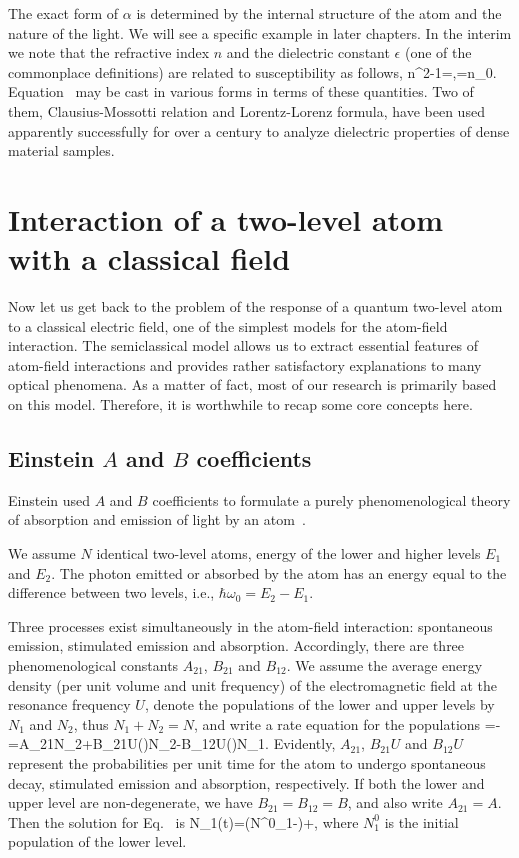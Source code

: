 The exact form of $\alpha$ is determined by the internal structure of the atom and the nature of the light. We will see a specific example in later chapters. In the interim we note that the refractive index $n$ and the dielectric constant $\epsilon$ (one of the commonplace definitions) are related to susceptibility as follows,
\beq
n^2-1=\chi,\quad \epsilon=n\epsilon_0.
\eeq
Equation~ may be cast in various forms in terms of these quantities. Two of them, Clausius-Mossotti relation and Lorentz-Lorenz formula, have been used apparently successfully for over a century to analyze dielectric properties of dense material samples.

\section{Interaction of a two-level atom with a classical field}

Now let us get back to the problem of the response of a quantum two-level atom to a classical electric field, one of the simplest models for the atom-field interaction\cite{quantum_optics}. The semiclassical model allows us to extract essential features of atom-field interactions and provides rather satisfactory explanations to many optical phenomena. As a matter of fact, most of our research is primarily based on this model. Therefore, it is worthwhile to recap some core concepts here.

\subsection{Einstein $A$ and $B$ coefficients}
Einstein used $A$ and $B$ coefficients to formulate a purely phenomenological theory of  absorption and emission of light by an atom~\cite{quantum_optics,1982AmJPh..50..982H}.

We assume $N$ identical two-level atoms, energy of the lower and higher levels  $E_1$ and $E_2$. The photon emitted or absorbed by the atom has an energy equal to the difference between two levels, i.e., $\hbar\omega_0=E_2-E_1$.

Three processes exist simultaneously in the atom-field interaction: spontaneous emission, stimulated emission and absorption. Accordingly, there are three phenomenological constants $A_{21}$, $B_{21}$ and $B_{12}$. We assume the average energy density (per unit volume and unit frequency) of the electromagnetic field at the resonance frequency $U$, denote the populations of the lower and upper levels by $N_1$ and $N_2$, thus $N_1+N_2=N$, and write a rate equation for the populations
\bea
{}=-=A_{21}N_2+B_{21}U(\omega)N_2-B_{12}U(\omega)N_1.
\label{AB_RATE}
\eea
Evidently, $A_{21}$, $B_{21}U$ and $B_{12}U$ represent the probabilities per unit time for the atom to undergo spontaneous decay, stimulated emission and absorption, respectively. 
If  both the lower and upper level are non-degenerate, we  have $B_{21}=B_{12}=B$, and also write $A_{21}=A$. Then the solution for Eq.~ is
\bea
N_1(t)=\left(N^0_1-\right)\exp{}+,
\eea
where $N^0_1$ is the initial population of the lower level.

